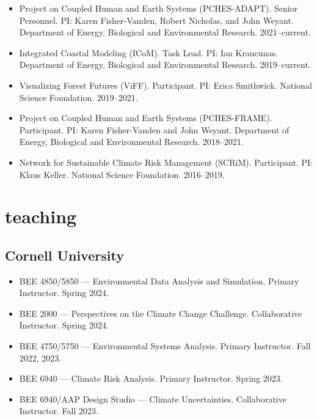 \documentclass[11pt,article,oneside]{memoir}
\begin{document}
\begin{itemize}[label={}]

\item Project on Coupled Human and Earth Systems (PCHES-ADAPT). Senior Personnel. PI: Karen Fisher-Vanden, Robert Nicholas, and John Weyant. Department of Energy, Biological and Environmental Research. 2021--current.

\item Integrated Coastal Modeling (ICoM). Task Lead. PI: Ian Kraucunas. Department of Energy, Biological and Environmental Research. 2019--current.

\item Visualizing Forest Futures (ViFF). Participant. PI: Erica Smithwick. National Science Foundation. 2019--2021.

\item Project on Coupled Human and Earth Systems (PCHES-FRAME). Participant. PI: Karen Fisher-Vanden and John Weyant. Department of Energy, Biological and Environmental Research. 2018--2021.

\item Network for Sustainable Climate Risk Management (SCRiM). Participant. PI: Klaus Keller. National Science Foundation. 2016--2019.

\end{itemize}


\section{teaching}

\mbox{}\vspace{-\dimexpr\baselineskip\relax}

\vspace{\baselineskip}



\subsection{Cornell University}
\begin{itemize}[label={}]

\item BEE 4850/5850 --- Environmental Data Analysis and Simulation. Primary Instructor. Spring 2024.

\item BEE 2000 --- Perspectives on the Climate Change Challenge. Collaborative Instructor. Spring 2024.

\item BEE 4750/5750 --- Environmental Systems Analysis. Primary Instructor. Fall 2022, 2023.

\item BEE 6940 --- Climate Risk Analysis. Primary Instructor. Spring 2023.

\item BEE 6940/AAP Design Studio --- Climate Uncertainties. Collaborative Instructor. Fall 2023.

\end{itemize}
\end{document}
